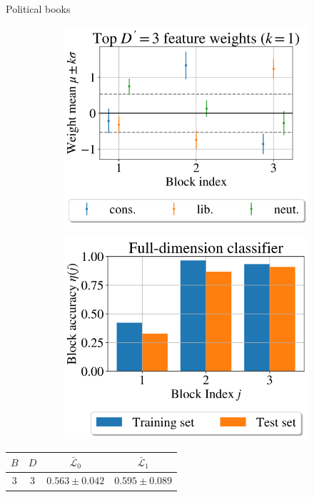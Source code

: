 \documentclass{beamer}
\newcommand{\Lcal}{\mathcal{L}}
\begin{document}
	\begin{frame}{Political books \cite{polbooks}}
		\begin{figure}[!h]
			\centering
			\begin{subfigure}[t]{0.452\linewidth}
				\centering
				\vskip 0pt
				\includegraphics[width=\linewidth]{polbooks-null-1}
			\end{subfigure}
			\begin{subfigure}[t]{0.45\linewidth}
				\centering
				\vskip 0pt
				\includegraphics[width=\linewidth]{polbooks-accuracy-1}
			\end{subfigure}
		\end{figure}
		\begin{table}
			\centering
			\begin{tabular}{cc|cc}
				$B$ & $D$ & $\bar{\Lcal}_0$ & $\bar{\Lcal}_1$ \\ \hline
				3 & 3 & $0.563 \pm 0.042$ & $0.595 \pm 0.089$
			\end{tabular}
		\end{table}
	\end{frame}
\end{document}
